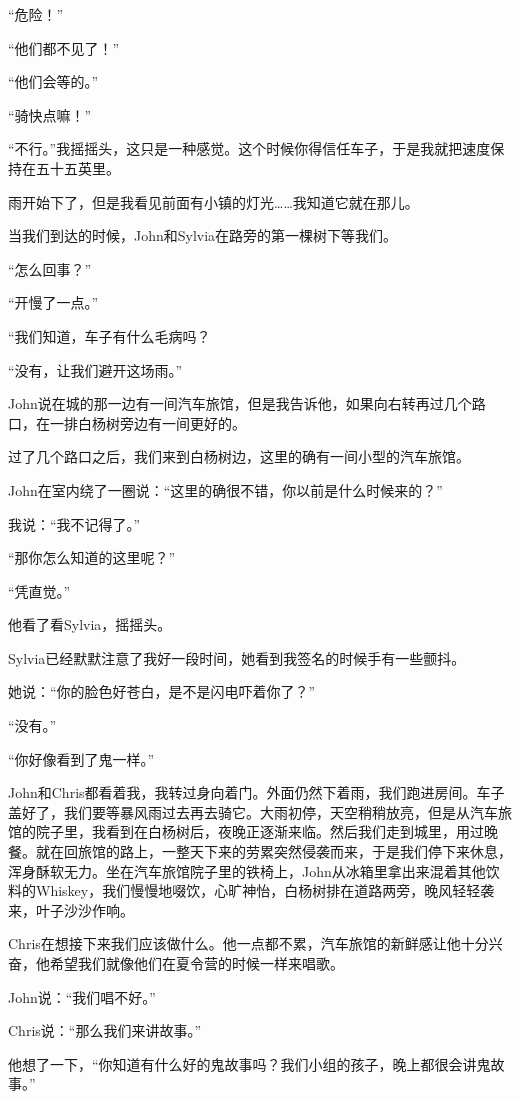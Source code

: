 \documentclass[UTF8]{article}
\begin{document}
\par “危险！”
\par “他们都不见了！”
\par “他们会等的。”
\par “骑快点嘛！”
\par “不行。”我摇摇头，这只是一种感觉。这个时候你得信任车子，于是我就把速度保持在五十五英里。
\par 雨开始下了，但是我看见前面有小镇的灯光……我知道它就在那儿。
\par 当我们到达的时候，John和Sylvia在路旁的第一棵树下等我们。
\par “怎么回事？”
\par “开慢了一点。”
\par “我们知道，车子有什么毛病吗？
\par “没有，让我们避开这场雨。”
\par John说在城的那一边有一间汽车旅馆，但是我告诉他，如果向右转再过几个路口，在一排白杨树旁边有一间更好的。
\par 过了几个路口之后，我们来到白杨树边，这里的确有一间小型的汽车旅馆。
\par John在室内绕了一圈说：“这里的确很不错，你以前是什么时候来的？”
\par 我说：“我不记得了。”
\par “那你怎么知道的这里呢？”
\par “凭直觉。”
\par 他看了看Sylvia，摇摇头。
\par Sylvia已经默默注意了我好一段时间，她看到我签名的时候手有一些颤抖。
\par 她说：“你的脸色好苍白，是不是闪电吓着你了？”
\par “没有。”
\par “你好像看到了鬼一样。”
\par John和Chris都看着我，我转过身向着门。外面仍然下着雨，我们跑进房间。车子盖好了，我们要等暴风雨过去再去骑它。大雨初停，天空稍稍放亮，但是从汽车旅馆的院子里，我看到在白杨树后，夜晚正逐渐来临。然后我们走到城里，用过晚餐。就在回旅馆的路上，一整天下来的劳累突然侵袭而来，于是我们停下来休息，浑身酥软无力。坐在汽车旅馆院子里的铁椅上，John从冰箱里拿出来混着其他饮料的Whiskey，我们慢慢地啜饮，心旷神怡，白杨树排在道路两旁，晚风轻轻袭来，叶子沙沙作响。
\par Chris在想接下来我们应该做什么。他一点都不累，汽车旅馆的新鲜感让他十分兴奋，他希望我们就像他们在夏令营的时候一样来唱歌。
\par John说：“我们唱不好。”
\par Chris说：“那么我们来讲故事。”
\par 他想了一下，“你知道有什么好的鬼故事吗？我们小组的孩子，晚上都很会讲鬼故事。”
\end{document}

